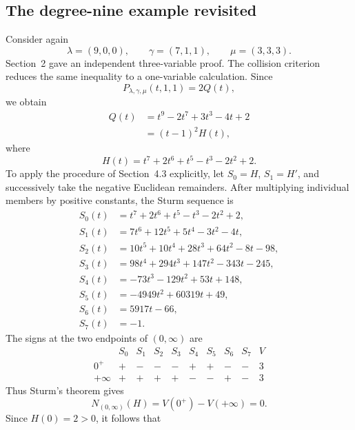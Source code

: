 \documentclass[11pt]{article}
\theoremstyle{definition}
\begin{document}
\subsection{The degree-nine example revisited}

Consider again
\begin{equation*}
\lambda=(9,0,0),
\qquad
\gamma=(7,1,1),
\qquad
\mu=(3,3,3).
\end{equation*}
Section~2 gave an independent three-variable proof.  The collision criterion reduces the same inequality to a one-variable calculation.  Since
\begin{equation*}
P_{\lambda,\gamma,\mu}(t,1,1)=2Q(t),
\end{equation*}
we obtain
\begin{align*}
Q(t)
&=t^9-2t^7+3t^3-4t+2\\
&=(t-1)^2H(t),
\end{align*}
where
\begin{equation*}
H(t)=t^7+2t^6+t^5-t^3-2t^2+2.
\end{equation*}
To apply the procedure of Section~4.3 explicitly, let \(S_0=H\), \(S_1=H'\), and successively take the negative Euclidean remainders.  After multiplying individual members by positive constants, the Sturm sequence is
\begin{align*}
S_0(t)&=t^7+2t^6+t^5-t^3-2t^2+2,\\
S_1(t)&=7t^6+12t^5+5t^4-3t^2-4t,\\
S_2(t)&=10t^5+10t^4+28t^3+64t^2-8t-98,\\
S_3(t)&=98t^4+294t^3+147t^2-343t-245,\\
S_4(t)&=-73t^3-129t^2+53t+148,\\
S_5(t)&=-4949t^2+60319t+49,\\
S_6(t)&=5917t-66,\\
S_7(t)&=-1.
\end{align*}
The signs at the two endpoints of \((0,\infty)\) are
\begin{equation*}
\begin{array}{c|cccccccc|c}
 &S_0&S_1&S_2&S_3&S_4&S_5&S_6&S_7&V\\ \hline
0^+&+&-&-&-&+&+&-&-&3\\
+\infty&+&+&+&+&-&-&+&-&3
\end{array}
\end{equation*}
Thus Sturm's theorem gives
\begin{equation*}
N_{(0,\infty)}(H)=V(0^+)-V(+\infty)=0.
\end{equation*}
Since \(H(0)=2>0\), it follows that
\end{document}
